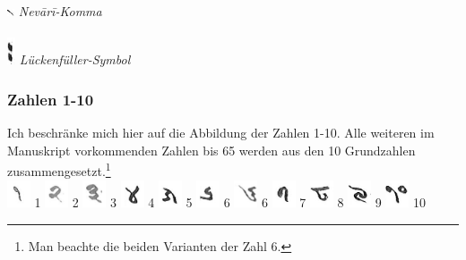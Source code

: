\documentclass[a4paper,12pt]{article}
\begin{document}
{\includegraphics[height=2.0mm]{nevarikomma.jpg} \textit{Nevārī-Komma} \\ \\
\includegraphics[height=8.0mm]{luecke.jpg} \textit{Lückenfüller-Symbol}


\subsubsection{Zahlen 1-10}
Ich beschränke mich hier auf die Abbildung der Zahlen 1-10. Alle weiteren im Manuskript vorkommenden Zahlen bis 65 werden aus den 10 Grundzahlen zusammengesetzt.\footnote{Man beachte die beiden Varianten der Zahl 6.}
\linebreak
\\ 
\includegraphics[height=8.0mm]{z1.jpg} 1 \includegraphics[height=8.0mm]{z2.jpg} 2 \includegraphics[height=8.0mm]{z3.jpg} 3 \includegraphics[height=8.0mm]{z4.jpg} 4 \includegraphics[height=8.0mm]{z5.jpg} 5 \includegraphics[height=8.0mm]{z6.jpg} 6 \includegraphics[height=8.0mm]{z6x.jpg} 6 \includegraphics[height=8.0mm]{z7.jpg} 7 \includegraphics[height=8.0mm]{z8.jpg} 8 \includegraphics[height=8.0mm]{z9.jpg} 9 \includegraphics[height=8.0mm]{z10.jpg} 10
\clearpage
}
\end{document}
